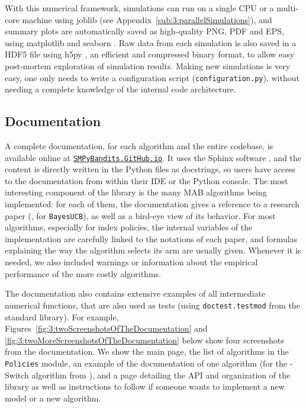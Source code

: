 With this numerical framework, simulations can run on a single CPU or a multi-core machine using joblib \cite{joblib} (see Appendix~\ref{sub:3:parallelSimulations}),
and summary plots are automatically saved as high-quality PNG, PDF and EPS, using matplotlib \cite{matplotlib} and seaborn \cite{seaborn}.
Raw data from each simulation is also saved in a HDF5 file using h5py \cite{h5py}, an efficient and compressed binary format, to allow easy post-mortem exploration of simulation results.
Making new simulations is very easy, one only needs to write a configuration script (\texttt{configuration.py}), without needing a complete knowledge of the internal code architecture.


\subsection{Documentation}

A complete documentation, for each algorithm and the entire codebase, is available online at
\texttt{\href{https://SMPyBandits.GitHub.io}{SMPyBandits.GitHub.io}}.
It uses the Sphinx software \cite{sphinx}, and the content is directly written in the Python files as docstrings, so users have access to the documentation from within their IDE or the Python console.
The most interesting component of the library is the many MAB algorithms being implemented: for each of them, the documentation gives a reference to a research paper (\eg, \cite{Kaufmann12BUCB} for \texttt{BayesUCB}), as well as a bird-eye view of its behavior.
For most algorithms, especially for index policies, the internal variables of the implementation are carefully linked to the notations of each paper, and formulas explaining the way the algorithm selects its arm are usually given.
Whenever it is needed, we also included warnings or information about the empirical performance of the more costly algorithms.

The documentation also contains extensive examples of all intermediate numerical functions, that are also used as tests (using \texttt{doctest.testmod} from the standard library).
For example, Figures~\ref{fig:3:twoScreenshotsOfTheDocumentation} and \ref{fig:3:twoMoreScreenshotsOfTheDocumentation} below show four screenshots from the documentation.
We show the main page, the list of algorithms in the \texttt{Policies} module, an example of the documentation of one algorithm (for the \klUCB-Switch algorithm from \cite{Garivier18}), and a page detailing the API and organization of the library as well as instructions to follow if someone wants to implement a new model or a new algorithm.

